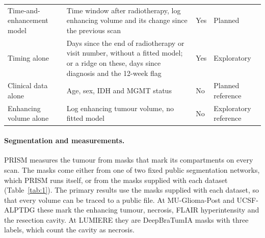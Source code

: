 \begin{table}[!htbp]
\begin{tabularx}{\linewidth}{@{}R{2.9cm}LR{1.3cm}R{3.4cm}@{}}
Time-and-enhancement model & Time window after radiotherapy, log enhancing volume and its change since the previous scan & Yes & Planned \\
Timing alone & Days since the end of radiotherapy or visit number, without a fitted model; or a ridge on these, days since diagnosis and the 12-week flag & Yes & Exploratory \\
Clinical data alone & Age, sex, IDH and MGMT status & No & Planned reference \\
Enhancing volume alone & Log enhancing tumour volume, no fitted model & No & Exploratory reference \\
\bottomrule
\end{tabularx}
\end{table}

\paragraph*{Segmentation and measurements.} PRISM measures the tumour from masks that mark its compartments on every
scan. The masks come either from one of two fixed public segmentation networks, which PRISM runs itself, or from the
masks supplied with each dataset (Table~\ref{tab:1}). The primary results use the masks supplied with each dataset, so
that every volume can be traced to a public file. At MU-Glioma-Post and UCSF-ALPTDG these mark the enhancing tumour,
necrosis, FLAIR hyperintensity and the resection cavity. At LUMIERE they are DeepBraTumIA masks with three labels,
which count the cavity as necrosis.


